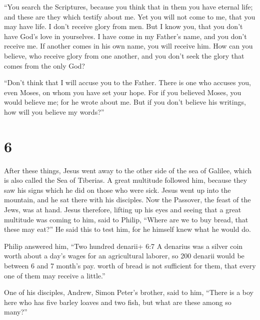  ``You search the Scriptures, because you think that in
them you have eternal life; and these are they which testify about me.
 Yet you will not come to me, that you may have life.
 I don't receive glory from men.  But I know
you, that you don't have God's love in yourselves.  I have
come in my Father's name, and you don't receive me. If another comes in
his own name, you will receive him.  How can you believe,
who receive glory from one another, and you don't seek the glory that
comes from the only God?

 ``Don't think that I will accuse you to the Father. There
is one who accuses you, even Moses, on whom you have set your hope.
 For if you believed Moses, you would believe me; for he
wrote about me.  But if you don't believe his writings, how
will you believe my words?''

\hypertarget{section-5}{%
\section{6}\label{section-5}}

 After these things, Jesus went away to the other side of
the sea of Galilee, which is also called the Sea of Tiberias.
 A great multitude followed him, because they saw his signs
which he did on those who were sick.  Jesus went up into the
mountain, and he sat there with his disciples.  Now the
Passover, the feast of the Jews, was at hand.  Jesus
therefore, lifting up his eyes and seeing that a great multitude was
coming to him, said to Philip, ``Where are we to buy bread, that these
may eat?''  He said this to test him, for he himself knew
what he would do.

 Philip answered him, ``Two hundred denarii+ 6:7 A denarius
was a silver coin worth about a day's wages for an agricultural laborer,
so 200 denarii would be between 6 and 7 month's pay. worth of bread is
not sufficient for them, that every one of them may receive a little.''

 One of his disciples, Andrew, Simon Peter's brother, said
to him,  ``There is a boy here who has five barley loaves
and two fish, but what are these among so many?''


